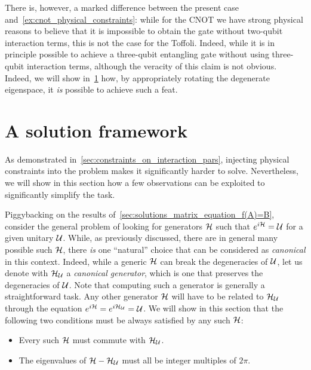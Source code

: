 \begin{example}[label={ex:toffoli_physical_constraints}]
There is, however, a marked difference between the present case and~\cref{ex:cnot_physical_constraints}: while for the CNOT we have strong physical reasons to believe that it is impossible to obtain the gate without two-qubit interaction terms, this is not the case for the Toffoli.
Indeed, while it is in principle possible to achieve a three-qubit entangling gate without using three-qubit interaction terms, although the veracity of this claim is not obvious.
Indeed, we will show in~\cref{sec:gatelearning_solution_framework} how, by appropriately rotating the degenerate eigenspace, it \textit{is} possible to achieve such a feat.
\end{example}

\section{A solution framework}
\label{sec:gatelearning_solution_framework}
As demonstrated in~\cref{sec:constraints_on_interaction_pars}, injecting physical constraints into the problem makes it significantly harder to solve.
Nevertheless, we will show in this section how a few observations can be exploited to significantly simplify the task.

Piggybacking on the results of~\cref{sec:solutions_matrix_equation_f(A)=B}, consider the general problem of looking for generators $\mathcal{H}$ such that $e^{i\mathcal{H}}=\mathcal{U}$ for a given unitary $\mathcal{U}$.
While, as previously discussed, there are in general many possible such $\mathcal{H}$, there \textit{is} one ``natural'' choice that can be considered as \textit{canonical} in this context.
Indeed, while a generic $\mathcal{H}$ can break the degeneracies of $\mathcal{U}$, let us denote with $\mathcal{H}_{\mathcal{U}}$ a \textit{canonical generator}, which is one that preserves the degeneracies of $\mathcal{U}$.
Note that computing such a generator is generally a straightforward task.
Any other generator $\mathcal{H}$ will have to be related to $\mathcal{H}_{\mathcal{U}}$ through the equation $e^{i\mathcal{H}}=e^{i\mathcal{H}_{\mathcal{U}}}=\mathcal{U}$.
We will show in this section that the following two conditions must be always satisfied by any such $\mathcal{H}$:
\begin{itemize}
    \item Every such $\mathcal{H}$ must commute with $\mathcal{H}_{\mathcal{U}}$.
    \item The eigenvalues of $\mathcal{H}-\mathcal{H}_{\mathcal{U}}$ must all be integer multiples of $2\pi$.
\end{itemize}

